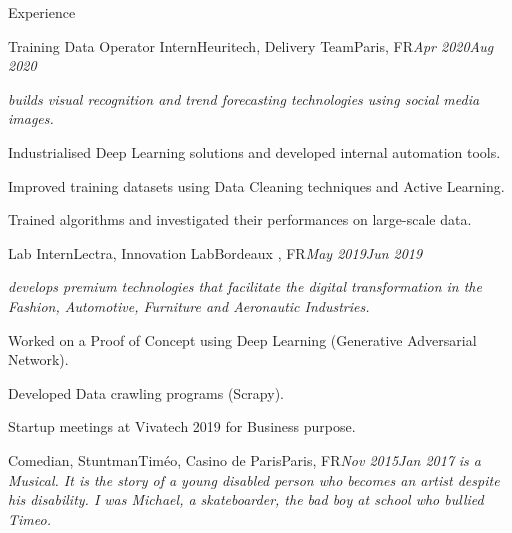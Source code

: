\documentclass{resume}
\begin{document}
	\begin{rSection}{Experience}
		\begin{job}{Training Data Operator Intern}{Heuritech, Delivery Team}{Paris, FR}{\em Apr 2020}{\em Aug 2020}{
			\textit{\small{builds visual recognition and trend forecasting technologies using social media images.}}
			\begin{itemize}
			\small{
  				\item Industrialised Deep Learning solutions and developed internal automation tools.
				\item Improved training datasets using Data Cleaning techniques and Active Learning.
				\item Trained algorithms and investigated their performances on large-scale data.
				}
			\end{itemize}
		}
		\end{job}
		\begin{job}{Lab Intern}{Lectra, Innovation Lab}{Bordeaux , FR}{\em May 2019}{\em Jun 2019}{
			\textit{\small{develops  premium technologies that facilitate the digital transformation in the Fashion, Automotive, Furniture and Aeronautic Industries.}}
			\begin{itemize}
			\small{
				  	\item Worked on a Proof of Concept using Deep Learning (Generative Adversarial Network).
					\item Developed Data crawling programs (Scrapy).
					\item Startup meetings at Vivatech 2019 for Business purpose.
				}
			\end{itemize}
		}
		\end{job}

		\begin{job}{Comedian, Stuntman}{Timéo, Casino de Paris}{Paris, FR}{\em Nov 2015}{\em Jan 2017}{
			\textit{\small{ is a Musical. It is the story of a young disabled person who becomes an artist despite his disability. I was Michael, a skateboarder, the bad boy at school who bullied Timeo.}}
		}
		\end{job}
	\end{rSection}
	
\end{document}
